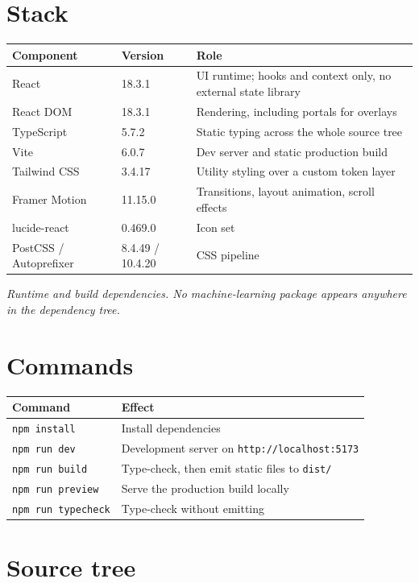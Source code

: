 \documentclass[11pt,a4paper]{report}
\newcommand{\code}[1]{\texttt{\small #1}}
\begin{document}
\section{Stack}

\begin{longtable}{L{4.6cm} L{3.2cm} L{7.2cm}}
\toprule
\textbf{Component} & \textbf{Version} & \textbf{Role} \\
\midrule
\endhead
React & 18.3.1 & UI runtime; hooks and context only, no external state library \\
React DOM & 18.3.1 & Rendering, including portals for overlays \\
TypeScript & 5.7.2 & Static typing across the whole source tree \\
Vite & 6.0.7 & Dev server and static production build \\
Tailwind CSS & 3.4.17 & Utility styling over a custom token layer \\
Framer Motion & 11.15.0 & Transitions, layout animation, scroll effects \\
lucide-react & 0.469.0 & Icon set \\
PostCSS / Autoprefixer & 8.4.49 / 10.4.20 & CSS pipeline \\
\bottomrule
\end{longtable}
\noindent\textit{\small Runtime and build dependencies. No machine-learning package appears
anywhere in the dependency tree.}\par\medskip

\section{Commands}

\begin{longtable}{L{5.2cm} L{9.6cm}}
\toprule
\textbf{Command} & \textbf{Effect} \\
\midrule
\endhead
\code{npm install} & Install dependencies \\
\code{npm run dev} & Development server on \code{http://localhost:5173} \\
\code{npm run build} & Type-check, then emit static files to \code{dist/} \\
\code{npm run preview} & Serve the production build locally \\
\code{npm run typecheck} & Type-check without emitting \\
\bottomrule
\end{longtable}

\section{Source tree}
\end{document}

